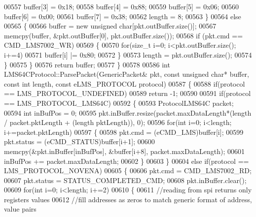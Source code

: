 \begin{DoxyCode}
{{{{{00557             buffer[3] = 0x18;
00558             buffer[4] = 0x88;
00559             buffer[5] = 0x06;
00560             buffer[6] = 0x00;
00561             buffer[7] = 0x38;
00562             length = 8;
00563         \}
00564         \textcolor{keywordflow}{else}
00565         \{
00566             buffer = \textcolor{keyword}{new} \textcolor{keywordtype}{unsigned} \textcolor{keywordtype}{char}[pkt.outBuffer.size()];
00567             memcpy(buffer, &pkt.outBuffer[0], pkt.outBuffer.size());
00568             \textcolor{keywordflow}{if} (pkt.cmd == CMD_LMS7002_WR)
00569             \{
00570                 \textcolor{keywordflow}{for}(\textcolor{keywordtype}{size\_t} i=0; i<pkt.outBuffer.size(); i+=4)
00571                     buffer[i] |= 0x80;
00572             \}
00573             length = pkt.outBuffer.size();
00574         \}
00575     \}
00576     \textcolor{keywordflow}{return} buffer;
00577 \}
00578 
00586 \textcolor{keywordtype}{int} LMS64CProtocol::ParsePacket(GenericPacket& pkt, \textcolor{keyword}{const} \textcolor{keywordtype}{unsigned} \textcolor{keywordtype}{char}* buffer, \textcolor{keyword}{const} \textcolor{keywordtype}{int} 
      length, \textcolor{keyword}{const} eLMS_PROTOCOL protocol)
00587 \{
00588     \textcolor{keywordflow}{if}(protocol == LMS_PROTOCOL_UNDEFINED)
00589         \textcolor{keywordflow}{return} -1;
00590 
00591     \textcolor{keywordflow}{if}(protocol == LMS_PROTOCOL_LMS64C)
00592     \{
00593         ProtocolLMS64C packet;
00594         \textcolor{keywordtype}{int} inBufPos = 0;
00595         pkt.inBuffer.resize(packet.maxDataLength*(length / packet.pktLength + (length %
      pktLength)), 0);
00596         \textcolor{keywordflow}{for}(\textcolor{keywordtype}{int} i=0; i<length; i+=packet.pktLength)
00597         \{
00598             pkt.cmd = (eCMD_LMS)buffer[i];
00599             pkt.status = (eCMD_STATUS)buffer[i+1];
00600             memcpy(&pkt.inBuffer[inBufPos], &buffer[i+8], packet.maxDataLength);
00601             inBufPos += packet.maxDataLength;
00602         \}
00603     \}
00604     \textcolor{keywordflow}{else} \textcolor{keywordflow}{if}(protocol == LMS_PROTOCOL_NOVENA)
00605     \{
00606         pkt.cmd = CMD_LMS7002_RD;
00607         pkt.status = STATUS_COMPLETED_CMD;
00608         pkt.inBuffer.clear();
00609         \textcolor{keywordflow}{for}(\textcolor{keywordtype}{int} i=0; i<length; i+=2)
00610         \{
00611             \textcolor{comment}{//reading from spi returns only registers values}
00612             \textcolor{comment}{//fill addresses as zeros to match generic format of address, value pairs}
}}}}}
\end{DoxyCode}
